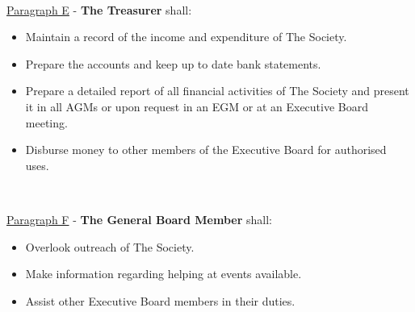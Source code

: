 ~

\underline{Paragraph E} - \textbf{The Treasurer} shall:

\begin{itemize}

    \item{Maintain a record of the income and expenditure of The Society.}

    \item{Prepare the accounts and keep up to date bank statements.}

    \item{Prepare a detailed report of all financial activities of The Society and present it in all AGMs or upon request in an EGM or at an Executive Board meeting.}

    \item{Disburse money to other members of the Executive Board for authorised uses.}

\end{itemize}

~

\underline{Paragraph F} - \textbf{The General Board Member}
shall:

\begin{itemize}

    \item{Overlook outreach of The Society.}

    \item{Make information regarding helping at events available.}

    \item{Assist other Executive Board members in their duties.}

\end{itemize}